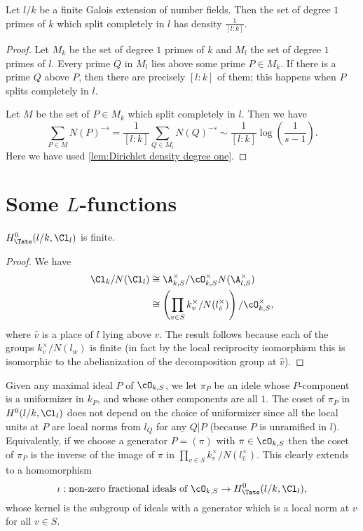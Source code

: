 \begin{lemma} \label{lem:Dirichlet density split}
	Let $l/k$ be a finite Galois extension of number fields.
	Then the set of degree $1$ primes of $k$ which split completely in $l$
	has density $\frac{1}{[l:k]}$.
\end{lemma}

\begin{proof}
	Let $M_k$ be the set of degree $1$ primes of $k$ and $M_l$ the set of degree $1$ primes of $l$.
	Every prime $Q$ in $M_l$ lies above some prime $P \in M_k$.
	If there is a prime $Q$ above $P$, then there are precisely $[l:k]$ of them; this happens when $P$
	splits completely in $l$.

	Let $M$ be the set of $P \in M_k$ which split completely in $l$.
	Then we have
	\[
		\sum_{P \in M} N(P)^{-s}
		=
		\frac{1}{[l:k]} \sum_{Q \in M_l} N(Q)^{-s}
		\sim \frac{1}{[l:k]} \log\left( \frac{1}{s-1}\right).
	\]
	Here we have used \ref{lem:Dirichlet density degree one}.
\end{proof}





\section{Some \texorpdfstring{$L$}{L}-functions}

\begin{lemma} \label{lem:H0 idele class group finite}
	$H^0_{\Tate}(l/k,\Cl_l)$ is finite.
\end{lemma}

\begin{proof}
	We have
	\begin{align*}
		\Cl_{k} / N(\Cl_l)
		& \cong \A_{k,S}^\times / \cO_{k,S}^\times N(\A_{l,S}^\times) \\
		& \cong \left(\prod_{v \in S} k_v^\times / N(l_{\hat v}^\times)\right) / \cO_{k,S}^\times,
	\end{align*}
	where $\hat v$ is a place of $l$ lying above $v$.
	The result follows because each of the groups $k_v^\times / N(l_w)$ is finite
	(in fact by the local reciprocity isomorphism this is isomorphic to the abelianization of the
	decomposition group at $\hat v$).
\end{proof}

Given any maximal ideal $P$ of $\cO_{k,S}$, we let $\pi_P$ be an idele whose
$P$-component is a uniformizer in $k_P$, and whose other components are all $1$.
The coset of $\pi_P$ in $H^0(l/k,\Cl_l)$ does not depend on the choice of uniformizer since
all the local units at $P$ are local norms from $l_{Q}$ for any $Q|P$
(because $P$ is unramified in $l$).
Equivalently, if we choose a generator $P=(\pi)$ with $\pi \in \cO_{k,S}$
then the coset of $\pi_P$ is the inverse of
the image of $\pi$ in $\prod_{v \in S} k_v^\times / N(l_{\hat v}^\times)$.
This clearly extends to a homomorphism
\[
	\iota : \textrm{non-zero fractional ideals of $\cO_{k,S}$}
	\to
	H^0_{\Tate}(l/k,\Cl_l),
\]
whose kernel is the subgroup of ideals with a generator which is a local norm at $v$ for
all $v \in S$.


